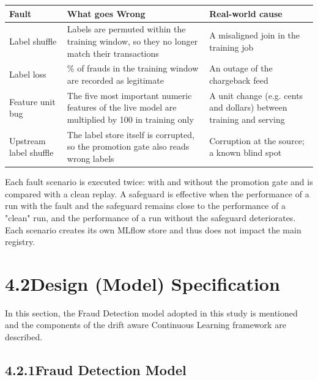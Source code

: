 \documentclass[11pt,letterpaper]{report}
\begin{document}
{\small
\begin{longtable}{|>{\raggedright\arraybackslash}p{}|>{\raggedright\arraybackslash}p{}|>{\raggedright\arraybackslash}p{}|}
\hline
Fault & What goes Wrong & Real-world cause \\ \hline
Label shuffle & Labels are permuted within the training window, so they no longer match their transactions & A misaligned join in the training job \\ \hline
Label loss & 80\% of frauds in the training window are recorded as legitimate & An outage of the chargeback feed \\ \hline
Feature unit bug & The five most important numeric features of the live model are multiplied by 100 in training only & A unit change (e.g. cents and dollars) between training and serving \\ \hline
Upstream label shuffle & The label store itself is corrupted, so the promotion gate also reads wrong labels & Corruption at the source; a known blind spot \\ \hline
\end{longtable}
}

Each fault scenario is executed twice: with and without the promotion gate and is compared with a clean replay. A safeguard is effective when the performance of a run with the fault and the safeguard remains close to the performance of a "clean" run, and the performance of a run without the safeguard deteriorates. Each scenario creates its own MLflow store and thus does not impact the main registry.

\section*{4.2\quad Design (Model) Specification}

In this section, the Fraud Detection model adopted in this study is mentioned and the components of the drift aware Continuous Learning framework are described.

\subsection*{4.2.1\quad Fraud Detection Model}
\end{document}
